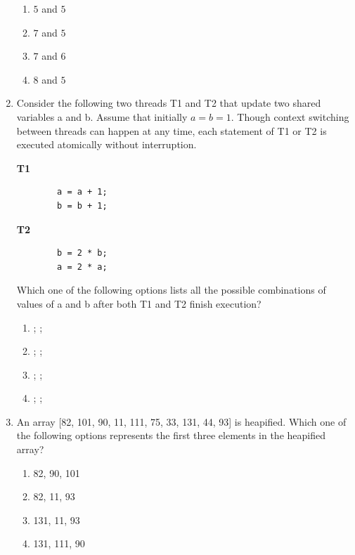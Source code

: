 \documentclass[a4paper, 11pt]{article}
\begin{document}
\begin{enumerate}
    \begin{enumerate}
        \item $5$ and $5$
        \item $7$ and $5$
        \item $7$ and $6$
        \item $8$ and $5$
    \end{enumerate}
    \hfill{}

    \item Consider the following two threads T1 and T2 that update two shared variables a and b. Assume that initially $a=b=1$. Though context switching between threads can happen at any time, each statement of T1 or T2 is executed atomically without interruption.
    
    \begin{minipage}{0.45\textwidth}
        \textbf{T1}
        \begin{verbatim}
        a = a + 1;
        b = b + 1;
        \end{verbatim}
    \end{minipage}
    \begin{minipage}{0.45\textwidth}
        \textbf{T2}
        \begin{verbatim}
        b = 2 * b;
        a = 2 * a;
        \end{verbatim}
    \end{minipage}
    
    Which one of the following options lists all the possible combinations of values of a and b after both T1 and T2 finish execution?

    \begin{enumerate}
        \item {}; ; 
        \item {}; ; 
        \item {}; ; 
        \item {}; ; 
    \end{enumerate}
    \hfill{}

    \item An array [82, 101, 90, 11, 111, 75, 33, 131, 44, 93] is heapified. Which one of the following options represents the first three elements in the heapified array?

    \begin{enumerate}
        \item 82, 90, 101
        \item 82, 11, 93
        \item 131, 11, 93
        \item 131, 111, 90
    \end{enumerate}
    \hfill{}


\end{enumerate}
\end{document}
